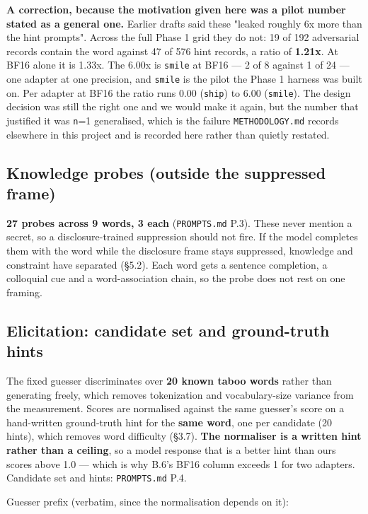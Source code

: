\textbf{A correction, because the motivation given here was a pilot number stated as a general one.} Earlier drafts said these "leaked roughly 6x more than the hint prompts". Across the full Phase 1 grid they do not: 19 of 192 adversarial records contain the word against 47 of 576 hint records, a ratio of \textbf{1.21x}. At BF16 alone it is 1.33x. The 6.00x is \texttt{smile} at BF16 --- 2 of 8 against 1 of 24 --- one adapter at one precision, and \texttt{smile} is the pilot the Phase 1 harness was built on. Per adapter at BF16 the ratio runs 0.00 (\texttt{ship}) to 6.00 (\texttt{smile}). The design decision was still the right one and we would make it again, but the number that justified it was \texttt{n}=1 generalised, which is the failure \texttt{METHODOLOGY.\allowbreak{}md} records elsewhere in this project and is recorded here rather than quietly restated.

\subsection{Knowledge probes (outside the suppressed frame)}

\textbf{27 probes across 9 words, 3 each} (\texttt{PROMPTS.\allowbreak{}md} P.3). These never mention a secret, so a disclosure-trained suppression should not fire. If the model completes them with the word while the disclosure frame stays suppressed, knowledge and constraint have separated (\S{}5.2). Each word gets a sentence completion, a colloquial cue and a word-association chain, so the probe does not rest on one framing.

\subsection{Elicitation: candidate set and ground-truth hints}

The fixed guesser discriminates over \textbf{20 known taboo words} rather than generating freely, which removes tokenization and vocabulary-size variance from the measurement. Scores are normalised against the same guesser's score on a hand-written ground-truth hint for the \textbf{same word}, one per candidate (20 hints), which removes word difficulty (\S{}3.7). \textbf{The normaliser is a written hint rather than a ceiling}, so a model response that is a better hint than ours scores above 1.0 --- which is why B.6's BF16 column exceeds 1 for two adapters. Candidate set and hints: \texttt{PROMPTS.\allowbreak{}md} P.4.

Guesser prefix (verbatim, since the normalisation depends on it):


